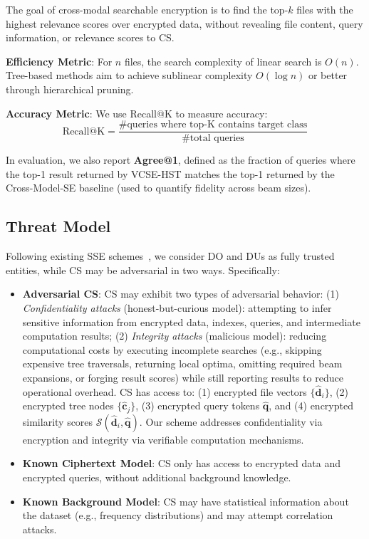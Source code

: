 \documentclass[journal]{IEEEtran}
\begin{document}
The goal of cross-modal searchable encryption is to find the top-$k$ files with the highest relevance scores over encrypted data, without revealing file content, query information, or relevance scores to CS.

\textbf{Efficiency Metric}: For $n$ files, the search complexity of linear search is $O(n)$. Tree-based methods aim to achieve sublinear complexity $O(\log n)$ or better through hierarchical pruning.

\textbf{Accuracy Metric}: We use Recall@K to measure accuracy:
\begin{equation}
\text{Recall@K} = \frac{\text{\# queries where top-K contains target class}}{{\text{\# total queries}}}
\end{equation}

In evaluation, we also report \textbf{Agree@1}, defined as the fraction of queries where the top-1 result returned by VCSE-HST matches the top-1 returned by the Cross-Model-SE baseline (used to quantify fidelity across beam sizes).

\subsection{Threat Model}

Following existing SSE schemes~\cite{miao2022ranked,yang2025secure}, we consider DO and DUs as fully trusted entities, while CS may be adversarial in two ways. Specifically:

\begin{itemize}
    \item \textbf{Adversarial CS}: CS may exhibit two types of adversarial behavior: (1) \emph{Confidentiality attacks} (honest-but-curious model): attempting to infer sensitive information from encrypted data, indexes, queries, and intermediate computation results; (2) \emph{Integrity attacks} (malicious model): reducing computational costs by executing incomplete searches (e.g., skipping expensive tree traversals, returning local optima, omitting required beam expansions, or forging result scores) while still reporting results to reduce operational overhead. CS has access to: (1) encrypted file vectors $\{\widehat{\mathbf{d}}_i\}$, (2) encrypted tree nodes $\{\widehat{\mathbf{c}}_j\}$, (3) encrypted query tokens $\widehat{\mathbf{q}}$, and (4) encrypted similarity scores $\mathcal{S}(\widehat{\mathbf{d}}_i, \widehat{\mathbf{q}})$. Our scheme addresses confidentiality via encryption and integrity via verifiable computation mechanisms.

    \item \textbf{Known Ciphertext Model}: CS only has access to encrypted data and encrypted queries, without additional background knowledge.

    \item \textbf{Known Background Model}: CS may have statistical information about the dataset (e.g., frequency distributions) and may attempt correlation attacks.
\end{itemize}
\end{document}
